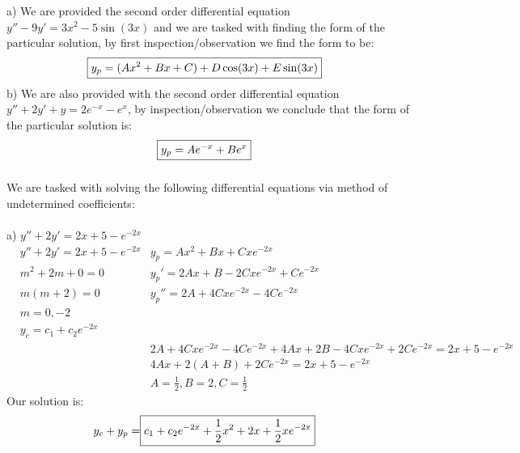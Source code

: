 \documentclass{article}
\begin{document}
\pagestyle{fancy}

\setcounter{section}{4}
\setcounter{subsection}{4}
\setcounter{subsubsection}{1}
\subsubsection{}
a) We are provided the second order differential equation $ y'' - 9y' = 3x^2 - 5\sin(3x) $ and we are tasked with finding the form of the particular solution, by first inspection/observation we find the form to be:
\begin{align}
    \Aboxed{y_p &= (Ax^2 + Bx + C) + D\cos(3x) + E\sin(3x)}
\end{align}
b) We are also provided with the second order differential equation $ y'' + 2y' + y = 2e^{-x} - e^x$, by inspection/observation we conclude that the form of the particular solution is:
\begin{align*}
    \Aboxed{y_p = Ae^{-x} + Be^x}
\end{align*}
\subsubsection{} 
We are tasked with solving the following differential equations via method of undetermined coefficients: \\ \\ a) $ y'' + 2y' = 2x + 5 - e^{-2x} $ \\
\setcounter{equation}{0}
\begin{align*}
    & y'' + 2y' = 2x + 5 - e^{-2x} &  y_p = Ax^2 + Bx + Cxe^{-2x} \\
    & m^2 + 2m + 0 = 0 & y_p' = 2Ax +B - 2Cxe^{-2x} + Ce^{-2x} \\ 
    & m(m + 2) = 0 & y_p'' = 2A + 4Cxe^{-2x} - 4Ce^{-2x}\\ 
    & m = 0, -2 \\
    & y_c = c_1 + c_2e^{-2x}  \\ && 2A + 4Cxe^{-2x} - 4Ce^{-2x} + 4Ax + 2B - 4Cxe^{-2x} + 2Ce^{-2x} = 2x + 5 - e^{-2x} \\ 
    && 4Ax + 2(A+B) +2Ce^{-2x} = 2x + 5 - e^{-2x} \\
    && A =\frac{1}{2}, B = 2, C = \frac{1}{2}
\end{align*}
Our solution is:
\begin{align*}
    y_c + y_p = \Aboxed{c_1 + c_2e^{-2x} +\frac{1}{2}x^2 + 2x + \frac{1}{2}xe^{-2x}}
\end{align*}
\end{document}
